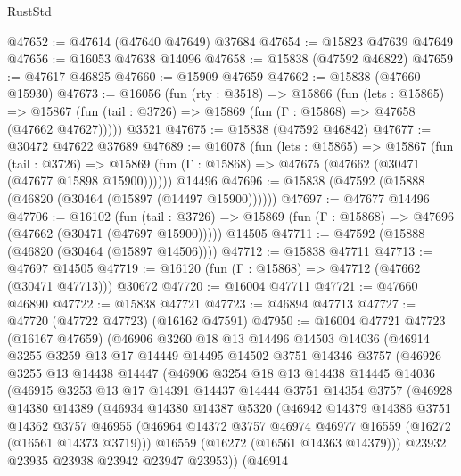 \begin{lexlean}{RustStd}
\begin{coremodule}
@47652 := @47614 (@47640 @47649) @37684
@47654 := @15823 @47639 @47649
@47656 := @16053 @47638 @14096
@47658 := @15838 (@47592 @46822)
@47659 := @47617 @46825
@47660 := @15909 @47659
@47662 := @15838 (@47660 @15930)
@47673 := @16056
    (fun (rty : @3518) =>
    @15866
      (fun (lets : @15865) =>
      @15867 (fun (tail : @3726) => @15869 (fun (Γ : @15868) => @47658 (@47662 @47627)))))
    @3521
@47675 := @15838 (@47592 @46842)
@47677 := @30472 @47622 @37689
@47689 := @16078
    (fun (lets : @15865) =>
    @15867
      (fun (tail : @3726) =>
      @15869 (fun (Γ : @15868) => @47675 (@47662 (@30471 (@47677 @15898 @15900))))))
    @14496
@47696 := @15838 (@47592 (@15888 (@46820 (@30464 (@15897 (@14497 @15900))))))
@47697 := @47677 @14496
@47706 := @16102
    (fun (tail : @3726) => @15869 (fun (Γ : @15868) => @47696 (@47662 (@30471 (@47697 @15900)))))
    @14505
@47711 := @47592 (@15888 (@46820 (@30464 (@15897 @14506))))
@47712 := @15838 @47711
@47713 := @47697 @14505
@47719 := @16120 (fun (Γ : @15868) => @47712 (@47662 (@30471 @47713))) @30672
@47720 := @16004 @47711
@47721 := @47660 @46890
@47722 := @15838 @47721
@47723 := @46894 @47713
@47727 := @47720 (@47722 @47723) (@16162 @47591)
@47950 := @16004
    @47721
    @47723
    (@16167 @47659)
    (@46906
      @3260
      @18
      @13
      @14496
      @14503
      @14036
      (@46914
        @3255
        @3259
        @13
        @17
        @14449
        @14495
        @14502
        @3751
        @14346
        @3757
        (@46926
          @3255
          @13
          @14438
          @14447
          (@46906
            @3254
            @18
            @13
            @14438
            @14445
            @14036
            (@46915
              @3253
              @13
              @17
              @14391
              @14437
              @14444
              @3751
              @14354
              @3757
              (@46928
                @14380
                @14389
                (@46934
                  @14380
                  @14387
                  @5320
                  (@46942
                    @14379
                    @14386
                    @3751
                    @14362
                    @3757
                    @46955
                    (@46964 @14372 @3757 @46974 @46977 @16559 (@16272 (@16561 @14373 @3719)))
                    @16559
                    (@16272 (@16561 @14363 @14379)))
                  @23932
                  @23935
                  @23938
                  @23942
                  @23947
                  @23953))
              (@46914

\end{coremodule}
\end{lexlean}
